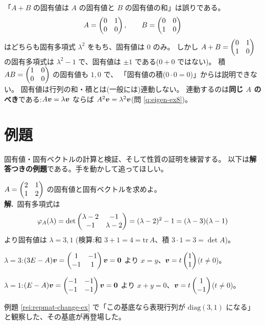\begin{hanrei}\label{hanrei:eigen-add}
「$A + B$ の固有値は $A$ の固有値と $B$ の固有値の和」は誤りである。
\[
A = \begin{pmatrix}0 & 1 \\ 0 & 0\end{pmatrix}, \qquad B = \begin{pmatrix}0 & 0 \\ 1 & 0\end{pmatrix}
\]
はどちらも固有多項式 $\lambda^2$ をもち、固有値は $0$ のみ。
しかし $A + B = \begin{pmatrix}0 & 1 \\ 1 & 0\end{pmatrix}$ の固有多項式は
$\lambda^2 - 1$ で、固有値は $\pm 1$ である($0 + 0$ ではない)。
積 $AB = \begin{pmatrix}1 & 0 \\ 0 & 0\end{pmatrix}$ の固有値も $1, 0$ で、
「固有値の積($0 \cdot 0 = 0$)」からは説明できない。
固有値は行列の和・積とは(一般には)連動しない。
連動するのは\textbf{同じ $A$ のべき}である:$A\bm{v} = \lambda\bm{v}$
ならば $A^2\bm{v} = \lambda^2\bm{v}$(問 \ref{q:eigen-ex8})。
\end{hanrei}

\section{例題}

固有値・固有ベクトルの計算と検証、そして性質の証明を練習する。
以下は\textbf{解答つきの例題}である。手を動かして追ってほしい。

\begin{rei}[例題・基本(固有値と固有ベクトルの計算)]\label{rei:eigen-basic}
$A = \begin{pmatrix}2 & 1 \\ 1 & 2\end{pmatrix}$ の固有値と固有ベクトルを求めよ。\\
\textbf{解.}\ 固有多項式は
\[
\varphi_A(\lambda) = \det\begin{pmatrix}\lambda - 2 & -1 \\ -1 & \lambda - 2\end{pmatrix}
= (\lambda - 2)^2 - 1 = (\lambda - 3)(\lambda - 1)
\]
より固有値は $\lambda = 3, 1$
(検算:和 $3 + 1 = 4 = \mathrm{tr}\,A$、積 $3 \cdot 1 = 3 = \det A$)。

$\lambda = 3$:$(3E - A)\bm{v} = \begin{pmatrix}1 & -1 \\ -1 & 1\end{pmatrix}\bm{v} = \bm{0}$
より $x = y$、$\bm{v} = t\begin{pmatrix}1 \\ 1\end{pmatrix}$($t \neq 0$)。

$\lambda = 1$:$(E - A)\bm{v} = \begin{pmatrix}-1 & -1 \\ -1 & -1\end{pmatrix}\bm{v} = \bm{0}$
より $x + y = 0$、$\bm{v} = t\begin{pmatrix}1 \\ -1\end{pmatrix}$($t \neq 0$)。

例題 \ref{rei:repmat-change-ex} で「この基底なら表現行列が
$\mathrm{diag}(3, 1)$ になる」と観察した、その基底が再登場した。
\end{rei}

